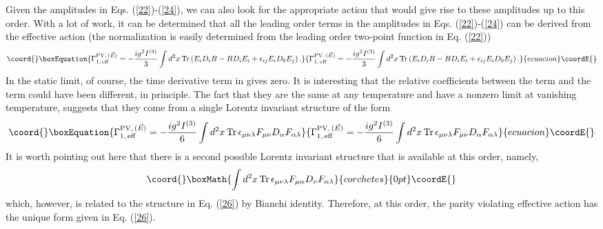 \documentclass[a4paper,12pt]{article}
\begin{document}
Given the amplitudes in Eqs. (\ref{22})-(\ref{24}), we can also look for
the appropriate action that would give rise to these amplitudes up to
this order. With a lot of work, it can be determined that all
the leading order terms in the amplitudes in Eqs. (\ref{22})-(\ref{24})
can be derived from the effective action
(the normalization is easily determined from the leading order two-point
function in Eq. (\ref{22}))
\begin{equation}\coord{}\boxEquation{
\Gamma_{1,\,{\rm eff}}^{{\rm PV},\,(\vec{E})} = 
-{i g^2 I^{(3)}\over 3}\int
d^{2}x\, {\rm Tr} \left(E_{i}D_{i}B - BD_{i}E_{i} +
  \epsilon_{ij}E_{i}D_{0}E_{j}\right).\label{25}
}{
\Gamma_{1,\,{\rm eff}}^{{\rm PV},\,(\vec{E})} = 
-{i g^2 I^{(3)}\over 3}\int
d^{2}x\, {\rm Tr} \left(E_{i}D_{i}B - BD_{i}E_{i} +
  \epsilon_{ij}E_{i}D_{0}E_{j}\right).}{ecuacion}\coordE{}\end{equation}
In the static limit, of course, the time derivative term in \coordHE{}
gives zero. It is interesting that the relative coefficients between
the \coordHE{} term and the \coordHE{} term could have been
different, in principle. The fact that they are the same at any
temperature  and have a
nonzero limit at vanishing temperature, suggests that they come from a
single Lorentz invariant structure of the form
\begin{equation}\coord{}\boxEquation{
\Gamma_{1,\,{\rm eff}}^{{\rm PV},\,(\vec{E})} = -{i g^2 I^{(3)}\over 6}
\int d^{2}x\, {\rm Tr}\,\epsilon_{\mu\nu\lambda}
F_{\mu\nu}D_{\alpha}F_{\alpha\lambda}\label{26}
}{
\Gamma_{1,\,{\rm eff}}^{{\rm PV},\,(\vec{E})} = -{i g^2 I^{(3)}\over 6}
\int d^{2}x\, {\rm Tr}\,\epsilon_{\mu\nu\lambda}
F_{\mu\nu}D_{\alpha}F_{\alpha\lambda}}{ecuacion}\coordE{}\end{equation}
It is worth pointing out here that there is a second possible Lorentz
invariant structure that is available at this order, namely,
\[\coord{}\boxMath{
\int d^{2}x\,{\rm
  Tr}\,\epsilon_{\mu\nu\lambda}F_{\mu\alpha}D_{\nu}F_{\alpha\lambda}
}{corchetes}{0pt}\coordE{}\]
which, however, is related to the structure in Eq. (\ref{26}) by
Bianchi identity. Therefore, at this order, the parity violating
effective action has the unique form given in Eq. (\ref{26}).
\end{document}
